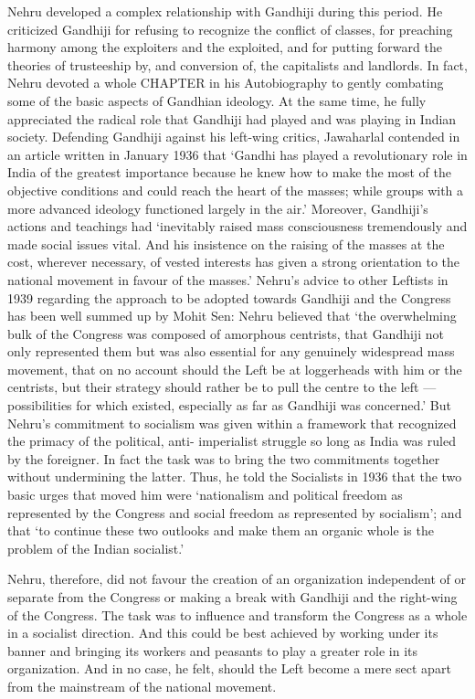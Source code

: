 \begin{multicols}{2}
Nehru developed a complex relationship with Gandhiji during this period. He criticized Gandhiji for refusing to recognize the conflict of classes, for preaching harmony among the exploiters and the exploited, and for putting forward the theories of trusteeship by, and conversion of, the capitalists and landlords. In fact, Nehru devoted a whole CHAPTER in his Autobiography to gently combating some of the basic aspects of Gandhian ideology. At the same time, he fully appreciated the radical role that Gandhiji had played and was playing in Indian society. Defending Gandhiji against his left-wing critics, Jawaharlal contended in an article written in January 1936 that `Gandhi has played a revolutionary role in India of the greatest importance because he knew how to make the most of the objective conditions and could reach the heart of the masses; while groups with a more advanced ideology functioned largely in the air.' Moreover, Gandhiji's actions and teachings had `inevitably raised mass consciousness tremendously and made social issues vital. And his insistence on the raising of the masses at the cost, wherever necessary, of vested interests has given a strong orientation to the national movement in favour of the masses.' Nehru's advice to other Leftists in 1939 regarding the approach to be adopted towards Gandhiji and the Congress has been well summed up by Mohit Sen: Nehru believed that `the overwhelming bulk of the Congress was composed of amorphous centrists, that Gandhiji not only represented them but was also essential for any genuinely widespread mass movement, that on no account should the Left be at loggerheads with him or the centrists, but their strategy should rather be to pull the centre to the left --- possibilities for which existed, especially as far as Gandhiji was concerned.' But Nehru's commitment to socialism was given within a framework that recognized the primacy of the political, anti- imperialist struggle so long as India was ruled by the foreigner. In fact the task was to bring the two commitments together without undermining the latter. Thus, he told the Socialists in 1936 that the two basic urges that moved him were `nationalism and political freedom as represented by the Congress and social freedom as represented by socialism'; and that `to continue these two outlooks and make them an organic whole is the problem of the Indian socialist.' 

Nehru, therefore, did not favour the creation of an organization independent of or separate from the Congress or making a break with Gandhiji and the right-wing of the Congress. The task was to influence and transform the Congress as a whole in a socialist direction. And this could be best achieved by working under its banner and bringing its workers and peasants to play a greater role in its organization. And in no case, he felt, should the Left become a mere sect apart from the mainstream of the national movement.


\end{multicols}
